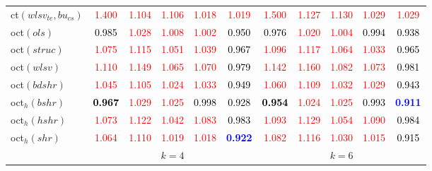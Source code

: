 \begin{tabular}[t]{l|>{}cccc>{}c|ccccc}
ct$(wlsv_{te}, bu_{cs})$ & \textcolor{red}{1.400} & \textcolor{red}{1.104} & \textcolor{red}{1.106} & \textcolor{red}{1.018} & \textcolor{red}{1.019} & \textcolor{red}{1.500} & \textcolor{red}{1.127} & \textcolor{red}{1.130} & \textcolor{red}{1.029} & \textcolor{red}{1.029}\\
oct$(ols)$ & \textcolor{black}{0.985} & \textcolor{red}{1.028} & \textcolor{red}{1.008} & \textcolor{red}{1.002} & \textcolor{black}{0.950} & \textcolor{black}{0.976} & \textcolor{red}{1.020} & \textcolor{red}{1.004} & \textcolor{black}{0.994} & \textcolor{black}{0.938}\\
oct$(struc)$ & \textcolor{red}{1.075} & \textcolor{red}{1.115} & \textcolor{red}{1.051} & \textcolor{red}{1.039} & \textcolor{black}{0.967} & \textcolor{red}{1.096} & \textcolor{red}{1.117} & \textcolor{red}{1.064} & \textcolor{red}{1.033} & \textcolor{black}{0.965}\\
oct$(wlsv)$ & \textcolor{red}{1.110} & \textcolor{red}{1.149} & \textcolor{red}{1.065} & \textcolor{red}{1.070} & \textcolor{black}{0.979} & \textcolor{red}{1.142} & \textcolor{red}{1.160} & \textcolor{red}{1.082} & \textcolor{red}{1.073} & \textcolor{black}{0.981}\\
oct$(bdshr)$ & \textcolor{red}{1.045} & \textcolor{red}{1.105} & \textcolor{red}{1.024} & \textcolor{red}{1.033} & \textcolor{black}{0.949} & \textcolor{red}{1.060} & \textcolor{red}{1.109} & \textcolor{red}{1.032} & \textcolor{red}{1.029} & \textcolor{black}{0.943}\\
oct$_h(bshr)$ & \textcolor{black}{\textbf{0.967}} & \textcolor{red}{1.029} & \textcolor{red}{1.025} & \textcolor{black}{0.998} & \textcolor{black}{0.928} & \textcolor{black}{\textbf{0.954}} & \textcolor{red}{1.024} & \textcolor{red}{1.025} & \textcolor{black}{0.993} & \textcolor{blue}{\textbf{0.911}}\\
oct$_h(hshr)$ & \textcolor{red}{1.073} & \textcolor{red}{1.122} & \textcolor{red}{1.042} & \textcolor{red}{1.083} & \textcolor{black}{0.983} & \textcolor{red}{1.093} & \textcolor{red}{1.129} & \textcolor{red}{1.054} & \textcolor{red}{1.090} & \textcolor{black}{0.984}\\
oct$_h(shr)$ & \textcolor{red}{1.064} & \textcolor{red}{1.110} & \textcolor{red}{1.019} & \textcolor{red}{1.018} & \textcolor{blue}{\textbf{0.922}} & \textcolor{red}{1.082} & \textcolor{red}{1.116} & \textcolor{red}{1.030} & \textcolor{red}{1.015} & \textcolor{black}{0.915}\\
\addlinespace[0.3em]
\multicolumn{1}{c}{} & \multicolumn{5}{c}{\textbf{$k = 4$}} & \multicolumn{5}{c}{\textbf{$k = 6$}}\\

\end{tabular}
